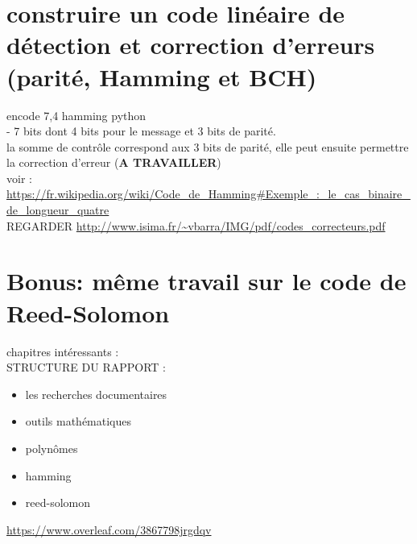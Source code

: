 \documentclass[a4paper,10pt]{report}
\begin{document}
\section{construire un code linéaire de détection et correction d'erreurs (parité, Hamming et BCH)}

encode 7,4 hamming python \\
- 7 bits dont 4 bits pour le message et 3 bits de parité. \\
la somme de contrôle correspond aux 3 bits de parité, elle peut ensuite permettre la correction d'erreur {\centering{}\huge(\textbf{A TRAVAILLER})} \\

voir : \url{https://fr.wikipedia.org/wiki/Code_de_Hamming#Exemple_:_le_cas_binaire_de_longueur_quatre} \\


REGARDER \url{http://www.isima.fr/~vbarra/IMG/pdf/codes_correcteurs.pdf} \\


\section{Bonus: même  travail sur le code de Reed-Solomon}


chapitres intéressants : \\


STRUCTURE DU RAPPORT :
\begin{itemize} 
    \item les recherches documentaires      
    \item outils mathématiques
    \item polynômes
    \item hamming
    \item reed-solomon
\end{itemize}
 \url{https://www.overleaf.com/3867798jrgdqv}
 
\end{document}
